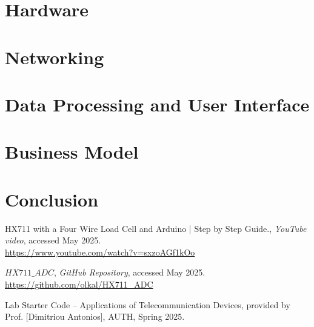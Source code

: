 \documentclass{article}
\begin{document}
\section{Hardware}


\section{Networking}


\section{Data Processing and User Interface}


\section{Business Model}


\section{Conclusion}


\begin{thebibliography}{9}

HX711 with a Four Wire Load Cell and Arduino | Step by Step Guide., 
\textit{YouTube video}, accessed May 2025. \\
\url{https://www.youtube.com/watch?v=sxzoAGf1kOo}

$HX711\_ADC$, 
\textit{GitHub Repository}, accessed May 2025. \\
\url{https://github.com/olkal/HX711_ADC}

Lab Starter Code – Applications of Telecommunication Devices, 
provided by Prof. [Dimitriou Antonios], AUTH, Spring 2025.


\end{thebibliography}
\end{document}
